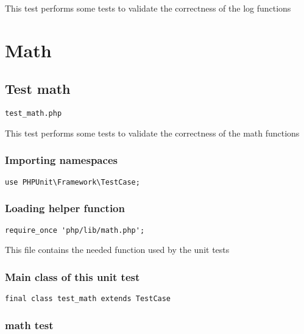 \documentclass[a4paper]{article}
\begin{document}
This test performs some tests to validate the correctness
of the log functions


\hypertarget{toc290}{}
\section{Math}

\hypertarget{toc291}{}
\subsection{Test math}

\begin{lstlisting}
test_math.php
\end{lstlisting}

This test performs some tests to validate the correctness
of the math functions

\hypertarget{toc292}{}
\subsubsection{Importing namespaces}

\begin{lstlisting}
use PHPUnit\Framework\TestCase;
\end{lstlisting}

\hypertarget{toc293}{}
\subsubsection{Loading helper function}

\begin{lstlisting}
require_once 'php/lib/math.php';
\end{lstlisting}

This file contains the needed function used by the unit tests

\hypertarget{toc294}{}
\subsubsection{Main class of this unit test}

\begin{lstlisting}
final class test_math extends TestCase
\end{lstlisting}

\hypertarget{toc295}{}
\subsubsection{math test}
\end{document}
